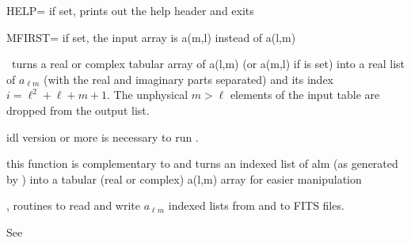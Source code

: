 \begin{keywords}
  \begin{kwlist}{} %
    \item[HELP=] %
	if set, prints out the help header and exits
    \item[MFIRST=] %
 if set, the input array is a(m,l) instead of a(l,m)
  \end{kwlist}
\end{keywords}  

\begin{codedescription}
{%
\thedocid\ turns a real or complex tabular array of a(l,m) (or a(m,l) if 
 is
set) into a real list of $a_{\ell m}$ (with the real and imaginary parts separated)
and its index $i=\ell^2+\ell+m+1$. The unphysical $m>\ell$ elements of the input
table are dropped from the output list.
}
\end{codedescription}



\begin{related}
  \begin{sulist}{} %
    \item[idl] version \idlversion or more is necessary to run \thedocid.
    \item[\htmlref{alm\_i2t}{idl:alm_i2t}] this function is complementary to
\thedocid{} and
turns an indexed list of alm (as generated by
) into a tabular (real or complex) a(l,m) array
for easier manipulation
  \item[\htmlref{alm2fits}{idl:alm2fits}, \htmlref{fits2alm}{idl:fits2alm}]
routines to read and write $a_{\ell m}$ indexed lists from and to FITS files.
  \end{sulist}
\end{related}

\begin{example}
{%
}%
{%
See 
}
\end{example}


